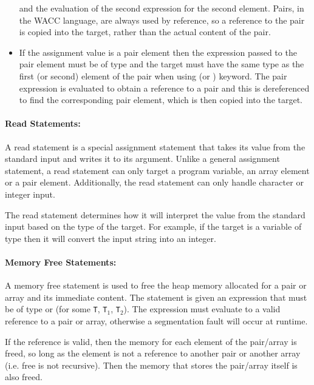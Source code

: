 \documentclass[a4paper]{article}
\theoremstyle{definition}
\begin{document}
\begin{itemize}
       and the evaluation of the second expression for the second element.
       Pairs, in the WACC language, are always used by reference, so a reference to the pair is copied into the target, rather than the actual content of the pair.
 \item If the assignment value is a pair element  then the expression passed to the pair element must be of type  
       and the target must have the same type as the first (or second) element of the pair when using  (or ) keyword.
       The pair expression is evaluated to obtain a reference to a pair and this is dereferenced to find the corresponding pair element,
       which is then copied into the target.
 \end{itemize}

\paragraph{Read Statements:}
A read statement  is a special assignment statement that takes its value from the standard input and writes it to its argument.
Unlike a general assignment statement, a read statement can only target a program variable, an array element or a pair element. 
Additionally, the read statement can only handle character or integer input.

The read statement determines how it will interpret the value from the standard input based on the type of the target.
For example, if the target is a variable of type  then it will convert the input string into an integer.

\paragraph{Memory Free Statements:}
A memory free statement  is used to free the heap memory allocated for a pair or array and its immediate content. 
The statement is given an expression that must be of type  or  (for some {\tt T}, {\tt T}$_1$, {\tt T}$_2$). 
The expression must evaluate to a valid reference to a pair or array, otherwise a segmentation fault will occur at runtime.

If the reference is valid, then the memory for each element of the pair/array is freed, so long as the element is not a reference to another pair or another array
(i.e. free is not recursive). 
Then the memory that stores the pair/array itself is also freed.
\end{document}
